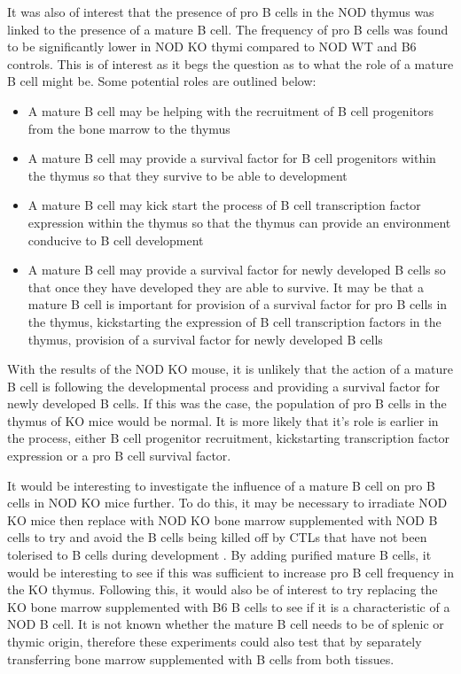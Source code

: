 It was also of interest that the presence of pro B cells in the NOD thymus was linked to the presence of a mature B cell.
The frequency of pro B cells was found to be significantly lower in NOD KO thymi compared to NOD WT and B6 controls.
This is of interest as it begs the question as to what the role of a mature B cell might be.
Some potential roles are outlined below:
\begin{itemize}
\item A mature B cell may be helping with the recruitment of B cell progenitors from the bone marrow to the thymus
\item A mature B cell may provide a survival factor for B cell progenitors within the thymus so that they survive to be able to development
\item A mature B cell may kick start the process of B cell transcription factor expression within the thymus so that the thymus can provide an environment conducive to B cell development
\item A mature B cell may provide a survival factor for newly developed B cells so that once they have developed they are able to survive.
It may be that a mature B cell is important for provision of a survival factor for pro B cells in the thymus, kickstarting the expression of B cell transcription factors in the thymus, provision of a survival factor for newly developed B cells 
\end{itemize}

With the results of the NOD KO mouse, it is unlikely that the action of a mature B cell is following the developmental process and providing a survival factor for newly developed B cells.
If this was the case, the population of pro B cells in the thymus of KO mice would be normal.
It is more likely that it's role is earlier in the process, either B cell progenitor recruitment, kickstarting transcription factor expression or a pro B cell survival factor.

It would be interesting to investigate the influence of a mature B cell on pro B cells in NOD KO mice further.
To do this, it may be necessary to irradiate NOD KO mice then replace with NOD KO bone marrow supplemented with NOD B cells to try and avoid the B cells being killed off by CTLs that have not been tolerised to B cells during development \citep{Serreze1998}.
By adding purified mature B cells, it would be interesting to see if this was sufficient to increase pro B cell frequency in the KO thymus.
Following this, it would also be of interest to try replacing the KO bone marrow supplemented with B6 B cells to see if it is a characteristic of a NOD B cell.
It is not known whether the mature B cell needs to be of splenic or thymic origin, therefore these experiments could also test that by separately transferring bone marrow supplemented with B cells from both tissues.

